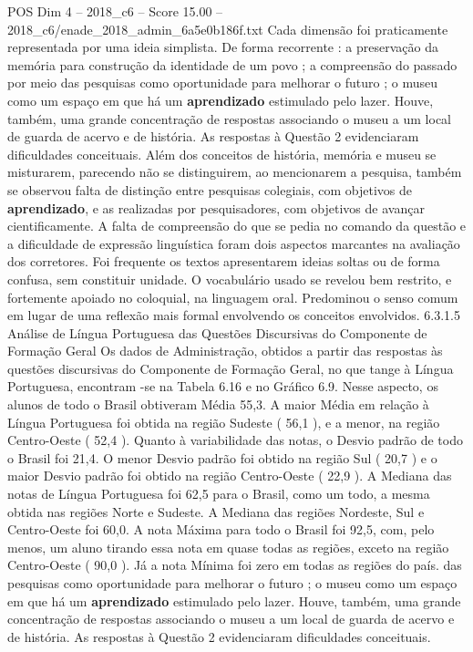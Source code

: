\begin{textsample}{POS Dim 4 – 2018\_c6 – Score 15.00 – 2018\_c6/enade\_2018\_admin\_6a5e0b186f.txt}
Cada dimensão foi praticamente representada por uma ideia simplista.
De forma recorrente : a preservação da memória para construção da identidade de um povo ; a compreensão do passado por meio das pesquisas como oportunidade para melhorar o futuro ; o museu como um espaço em que há um \textbf{aprendizado} estimulado pelo lazer.
Houve, também, uma grande concentração de respostas associando o museu a um local de guarda de acervo e de história.
As respostas à Questão 2 evidenciaram dificuldades conceituais.
Além dos conceitos de história, memória e museu se misturarem, parecendo não se distinguirem, ao mencionarem a pesquisa, também se observou falta de distinção entre pesquisas colegiais, com objetivos de \textbf{aprendizado}, e as realizadas por pesquisadores, com objetivos de avançar cientificamente.
A falta de compreensão do que se pedia no comando da questão e a dificuldade de expressão linguística foram dois aspectos marcantes na avaliação dos corretores.
Foi frequente os textos apresentarem ideias soltas ou de forma confusa, sem constituir unidade.
O vocabulário usado se revelou bem restrito, e fortemente apoiado no coloquial, na linguagem oral.
Predominou o senso comum em lugar de uma reflexão mais formal envolvendo os conceitos envolvidos. 6.3.1.5 Análise de Língua Portuguesa das Questões Discursivas do Componente de Formação Geral Os dados de Administração, obtidos a partir das respostas às questões discursivas do Componente de Formação Geral, no que tange à Língua Portuguesa, encontram -se na Tabela 6.16 e no Gráfico 6.9.
Nesse aspecto, os alunos de todo o Brasil obtiveram Média 55,3.
A maior Média em relação à Língua Portuguesa foi obtida na região Sudeste ( 56,1 ), e a menor, na região Centro-Oeste ( 52,4 ).
Quanto à variabilidade das notas, o Desvio padrão de todo o Brasil foi 21,4.
O menor Desvio padrão foi obtido na região Sul ( 20,7 ) e o maior Desvio padrão foi obtido na região Centro-Oeste ( 22,9 ).
A Mediana das notas de Língua Portuguesa foi 62,5 para o Brasil, como um todo, a mesma obtida nas regiões Norte e Sudeste.
A Mediana das regiões Nordeste, Sul e Centro-Oeste foi 60,0.
A nota Máxima para todo o Brasil foi 92,5, com, pelo menos, um aluno tirando essa nota em quase todas as regiões, exceto na região Centro-Oeste ( 90,0 ).
Já a nota Mínima foi zero em todas as regiões do país. das pesquisas como oportunidade para melhorar o futuro ; o museu como um espaço em que há um \textbf{aprendizado} estimulado pelo lazer.
Houve, também, uma grande concentração de respostas associando o museu a um local de guarda de acervo e de história.
As respostas à Questão 2 evidenciaram dificuldades conceituais.

\end{textsample}
